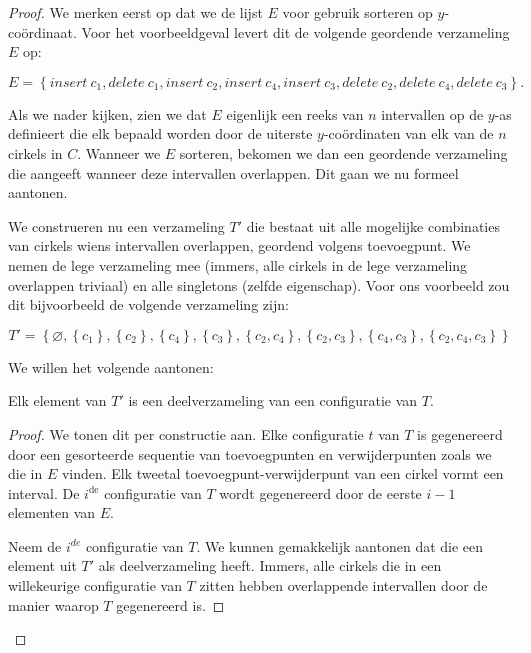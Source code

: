 \begin{proof}
We merken eerst op dat we de lijst $E$ voor gebruik sorteren op
$y$-co\"ordinaat. Voor het voorbeeldgeval levert dit de volgende
geordende verzameling $E$ op: 

\[E = \left\{insert\ c_1, delete\ c_1,
insert\ c_2, insert\ c_4, insert\ c_3, delete\ c_2, delete\ c_4,
delete\ c_3 \right\}.\]

Als we nader kijken, zien we dat $E$ eigenlijk een reeks van $n$
intervallen op de $y$-as definieert die elk bepaald worden door de
uiterste $y$-co\"ordinaten van elk van de $n$ cirkels in $C$. Wanneer
we $E$ sorteren, bekomen we dan een geordende verzameling die aangeeft
wanneer deze intervallen overlappen. Dit gaan we nu formeel aantonen.

We construeren nu een verzameling $T'$ die bestaat uit alle mogelijke
combinaties van cirkels wiens intervallen overlappen, geordend volgens
toevoegpunt. We nemen de lege verzameling mee (immers, alle cirkels in
de lege verzameling overlappen triviaal) en alle singletons (zelfde
eigenschap). Voor ons voorbeeld zou dit bijvoorbeeld de volgende
verzameling zijn:

\[T' = \left\{\varnothing, \left\{c_1\right\}, \left\{c_2\right\}, \left\{c_4\right\}, \left\{c_3\right\}, \left\{c_2,c_4\right\}, \left\{c_2,c_3\right\}, \left\{c_4,c_3\right\},\left\{c_2,c_4,c_3\right\}\right\}\]

We willen het volgende aantonen:

\begin{lemma}
Elk element van $T'$ is een deelverzameling van een configuratie van $T$.
\label{lemma:intervals}
\end{lemma}
\begin{proof}
We tonen dit per constructie aan. Elke configuratie $t$ van $T$ is
gegenereerd door een gesorteerde sequentie van toevoegpunten en
verwijderpunten zoals we die in $E$ vinden. Elk tweetal
toevoegpunt-verwijderpunt van een cirkel vormt een interval. De
$i^{\textrm{de}}$ configuratie van $T$ wordt gegenereerd door de
eerste $i - 1$ elementen van $E$. 

Neem de $i^{de}$ configuratie van $T$. We kunnen gemakkelijk aantonen
dat die een element uit $T'$ als deelverzameling heeft. Immers, alle
cirkels die in een willekeurige configuratie van $T$ zitten hebben
overlappende intervallen door de manier waarop $T$ gegenereerd is.



\end{proof}
\end{proof}
